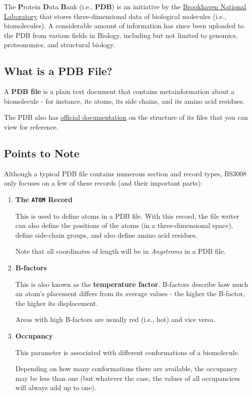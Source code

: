 \documentclass[
  letterpaper,
  DIV=11,
  numbers=noendperiod]{scrreprt}
\begin{document}
The \textbf{P}rotein \textbf{D}ata \textbf{B}ank (i.e., \textbf{PDB}) is
an initiative by the \href{https://www.bnl.gov/world/}{Brookhaven
National Laboratory} that stores three-dimensional data of biological
molecules (i.e., biomolecules). A considerable amount of information has
since been uploaded to the PDB from various fields in Biology, including
but not limited to genomics, proteonomics, and structural biology.

\hypertarget{what-is-a-pdb-file}{%
\subsection{What is a PDB File?}\label{what-is-a-pdb-file}}

A \textbf{PDB file} is a plain text document that contains
metainformation about a biomolecule - for instance, its atoms, its side
chains, and its amino acid residues.

The PDB also has
\href{https://files.wwpdb.org/pub/pdb/doc/format_descriptions/Format_v33_Letter.pdf}{official
documentation} on the structure of its files that you can view for
reference.

\hypertarget{points-to-note}{%
\subsection{Points to Note}\label{points-to-note}}

Although a typical PDB file contains numerous section and record types,
BS3008 only focuses on a few of these records (and their important
parts):

\begin{enumerate}
\def\labelenumi{\arabic{enumi}.}
\item
  \textbf{The \texttt{ATOM} Record}

  This is used to define atoms in a PDB file. With this record, the file
  writer can also define the positions of the atoms (in a
  three-dimensional space), define side-chain groups, and also define
  amino acid residues.

  Note that all coordinates of length will be in \emph{Angstroms} in a
  PDB file.
\item
  \textbf{B-factors}

  This is also known as the \textbf{temperature factor}. B-factors
  describe how much an atom's placement differs from its average values
  - the higher the B-factor, the higher its displacement.

  Areas with high B-factors are usually red (i.e., hot) and vice versa.
\item
  \textbf{Occupancy}

  This parameter is associated with different conformations of a
  biomolecule.

  Depending on how many conformations there are available, the occupancy
  may be less than one (but whatever the case, the values of all
  occupancices will always add up to one).
\end{enumerate}
\end{document}
